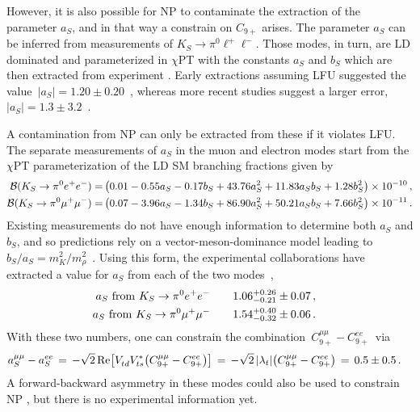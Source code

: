 \documentclass[amsmath,amssymb,aps,nofootinbib,prd,preprint,superscriptaddress,tightenlines,a4paper,bm]{revtex4-2}
\begin{document}
However, it is also possible for NP to contaminate the extraction of the parameter $a_S$, and in that way a constrain on $C_{9+}$ arises. The parameter $a_S$ can be inferred from measurements of $K_S\to \pi^0\ell^+\ell^-$.
Those modes, in turn,  are LD dominated and parameterized in $\chi$PT with the constants $a_S$ and $b_S$ which are then extracted from experiment \cite{Ecker:1987qi,DAmbrosio:1998gur}.
Early extractions assuming LFU suggested the value \,$|a_S| = 1.20 \pm 0.20$\, \cite{Isidori:2004rb}, whereas more recent studies  suggest a larger error, \,$|a_S|=1.3\pm3.2$\, \cite{DAmbrosio:2018ytt}.

A contamination from NP can only be extracted from these if it violates LFU.
The separate measurements of $a_S$ in the muon and electron modes start from the $\chi$PT parameterization of the LD SM branching fractions given by  \cite{Cirigliano:2011ny}
\begin{align}
    {\cal B}(K_S\to\pi^0e^+e^-)=&\left(0.01-0.55a_S-0.17b_S+43.76a_S^2+11.83a_S b_S+1.28b_S^2\right)\times 10^{-10} \,,\nonumber \\
    {\cal B}(K_S\to\pi^0\mu^+\mu^-)=&\left(0.07-3.96a_S-1.34b_S+86.90a_S^2+50.21a_S b_S+7.66b_S^2\right)\times 10^{-11} \,.
\end{align}
Existing measurements do not have enough information to determine both $a_S$ and $b_S$, and so predictions rely on a vector-meson-dominance model leading to \,$b_S/a_S=m_{K}^2/m_\rho^2$\, \cite{DAmbrosio:1998gur}.
Using this form, the experimental collaborations have extracted a value for $a_S$ from each of the two modes~\cite{Batley:2003mu,Batley:2004wg},
\begin{align}
                a_S {\rm~from~} K_S\to\pi^0 e^+e^- ~~~  & \quad1.06^{+0.26}_{-0.21}\pm0.07 \,, \nonumber \\
                a_S {\rm~from~} K_S\to\pi^0\mu^+\mu^- ~~~ & \quad 1.54^{+0.40}_{-0.32}\pm0.06 \,. &
\end{align}
With these two numbers, one can constrain the combination \,$C^{\mu\mu}_{9+}-C^{ee}_{9+}$\, via
\begin{align}\label{eq:K_+FUV}
    a_S^{\mu\mu}-a_S^{ee} & \,=\, -\sqrt{2}\, {\rm Re} \big[ V_{td}^{} V^*_{ts} \big( C^{\mu\mu}_{9+}-C^{ee}_{9+} \big) \big] \,=\, -\sqrt{2}\,|\lambda_t|\big( C^{\mu\mu}_{9+}-C^{ee}_{9+} \big) \,=\, 0.5\pm0.5 \,. &
\end{align}
A forward-backward asymmetry in these modes could also be used to constrain NP \cite{Mescia:2006jd}, but there is no experimental information yet.
\end{document}
